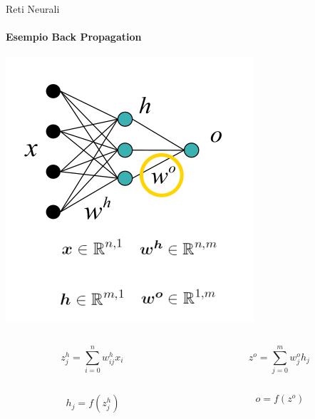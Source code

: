 \documentclass[
 ]{beamer}
\begin{document}
\begin{frame}{Reti Neurali}
    \framesubtitle{Esempio Back Propagation}
    
    \begin{center}
      \includegraphics[scale = 0.35]{back1.png}
    \end{center}
    
    \begin{columns}
        \begin{column}{0.48\textwidth}
            \begin{equation*}
                z_j^{h} = \sum_{i=0}^{n} w_{ij}^{h}x_i
            \end{equation*}
        \end{column}
        \begin{column}{0.48\textwidth}
            \begin{equation*}
                z^{o} = \sum_{j=0}^{m} w_{j}^{o}h_j
            \end{equation*}
        \end{column}
    \end{columns}
    
    \smallskip
    
    \begin{columns}
        \begin{column}{0.48\textwidth}
            \begin{equation*}
                h_j = f(z_j^{h})
            \end{equation*}
        \end{column}
        \begin{column}{0.48\textwidth}
            \begin{equation*}
                o = f(z^{o})
            \end{equation*}
        \end{column}
    \end{columns}    
\end{frame} 
\end{document}
